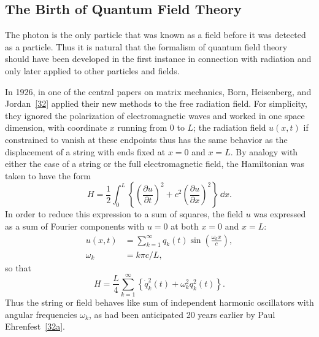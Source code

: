 
\subsection{The Birth of Quantum Field Theory}

The photon is the only particle that was known as a field before it was
detected as a particle. Thus it is natural that the formalism of quantum
field theory should have been developed in the first instance in connection
with radiation and only later applied to other particles and fields.

In 1926, in one of the central papers on matrix mechanics, Born,
Heisenberg, and Jordan~\hyperref[ref:1.32]{[32]} applied their new methods to the free radiation
field. For simplicity, they ignored the polarization of electromagnetic
waves and worked in one space dimension, with coordinate $x$ running
from 0 to $L$; the radiation field $u(x,t)$ if constrained to vanish at these
endpoints thus has the same behavior as the displacement of a string with
ends fixed at $x=0$ and $x=L$. By analogy with either the case of a string
or the full electromagnetic field, the Hamiltonian was taken to have the
form
\begin{equation}
  H=\frac{1}{2}\int_0^L
  \left\{\left(\frac{\partial u}{\partial t}\right)^2
  +c^2\left(\frac{\partial u}{\partial x}\right)^2\right\}\,\dd x.
  \tag{1.2.1}\label{eq:1.2.1}
\end{equation}
In order to reduce this expression to a sum of squares, the field $u$ was
expressed as a sum of Fourier components with $u=0$ at both $x=0$ and
$x=L$:
\begin{align}
  u(x,t)&=\sum_{k=1}^{\infty}q_k(t)\sin\left(\frac{\omega_kx}{c}\right),
  \tag{1.2.2}\label{eq:1.2.2}\\
  \omega_k&=k\pi c/L,
  \tag{1.2.3}\label{eq:1.2.3}
\end{align}
so that
\begin{equation}
  H=\frac{L}{4}\sum_{k=1}^{\infty}
  \left\{\dot q_k^2(t)+\omega_k^2q_k^2(t)\right\}.
  \tag{1.2.4}\label{eq:1.2.4}
\end{equation}
Thus the string or field behaves like sum of independent harmonic oscillators
with angular frequencies $\omega_k$, as had been anticipated 20 years earlier
by Paul Ehrenfest~\hyperref[ref:1.32a]{[32a]}.

